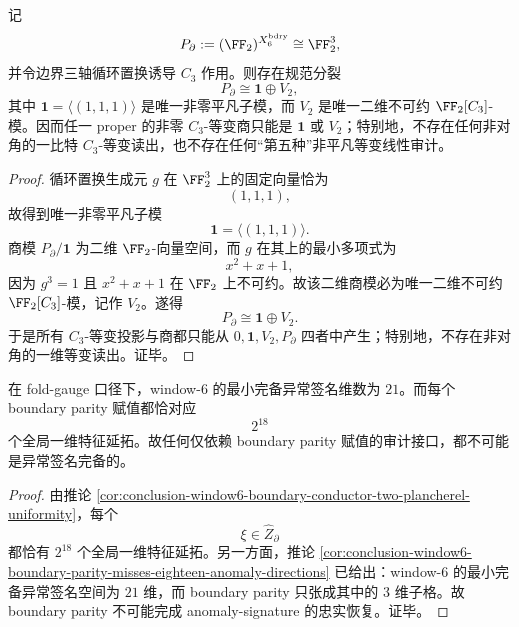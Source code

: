 \begin{theorem}\label{thm:conclusion-window6-boundary-c3-diagonal-irreducible-splitting}
记
\[
P_{\partial}:=(\FF_2)^{X_6^{\mathrm{bdry}}}\cong \FF_2^3,
\]
并令边界三轴循环置换诱导 \(C_3\) 作用。则存在规范分裂
\[
P_{\partial}\cong \mathbf 1\oplus V_2,
\]
其中 \(\mathbf 1=\langle(1,1,1)\rangle\) 是唯一非零平凡子模，而 \(V_2\) 是唯一二维不可约 \(\FF_2[C_3]\)-模。因而任一 proper 的非零 \(C_3\)-等变商只能是 \(\mathbf 1\) 或 \(V_2\)；特别地，不存在任何非对角的一比特 \(C_3\)-等变读出，也不存在任何“第五种”非平凡等变线性审计。
\end{theorem}
\begin{proof}
循环置换生成元 \(g\) 在 \(\FF_2^3\) 上的固定向量恰为
\[
(1,1,1),
\]
故得到唯一非零平凡子模
\[
\mathbf 1=\langle(1,1,1)\rangle.
\]
商模 \(P_{\partial}/\mathbf 1\) 为二维 \(\FF_2\)-向量空间，而 \(g\) 在其上的最小多项式为
\[
x^2+x+1,
\]
因为 \(g^3=1\) 且 \(x^2+x+1\) 在 \(\FF_2\) 上不可约。故该二维商模必为唯一二维不可约 \(\FF_2[C_3]\)-模，记作 \(V_2\)。遂得
\[
P_{\partial}\cong \mathbf 1\oplus V_2.
\]
于是所有 \(C_3\)-等变投影与商都只能从 \(0,\mathbf 1,V_2,P_{\partial}\) 四者中产生；特别地，不存在非对角的一维等变读出。证毕。
\end{proof}

\begin{corollary}\label{cor:conclusion-window6-boundary-parity-never-anomaly-complete}
在 fold-gauge 口径下，window-\(6\) 的最小完备异常签名维数为 \(21\)。而每个 boundary parity 赋值都恰对应
\[
2^{18}
\]
个全局一维特征延拓。故任何仅依赖 boundary parity 赋值的审计接口，都不可能是异常签名完备的。
\end{corollary}
\begin{proof}
由推论 \ref{cor:conclusion-window6-boundary-conductor-two-plancherel-uniformity}，每个
\[
\xi\in \widehat Z_{\partial}
\]
都恰有 \(2^{18}\) 个全局一维特征延拓。另一方面，推论 \ref{cor:conclusion-window6-boundary-parity-misses-eighteen-anomaly-directions} 已给出：window-\(6\) 的最小完备异常签名空间为 \(21\) 维，而 boundary parity 只张成其中的 \(3\) 维子格。故 boundary parity 不可能完成 anomaly-signature 的忠实恢复。证毕。
\end{proof}

